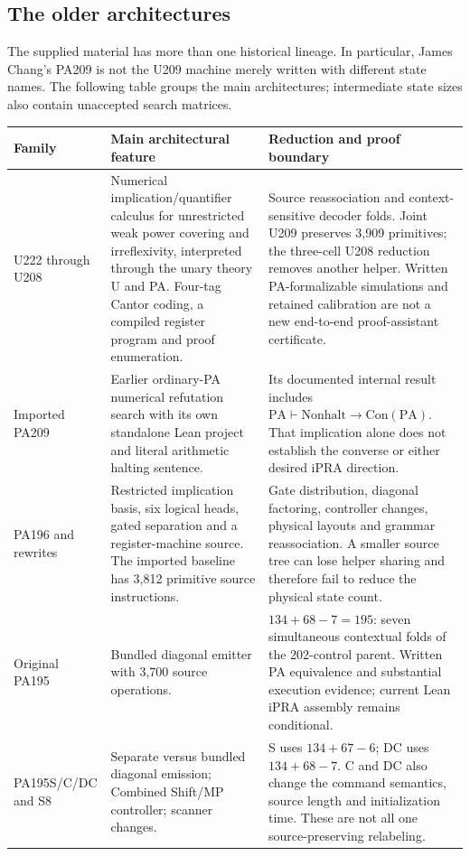 \subsection{The older architectures}

The supplied material has more than one historical lineage. In particular,
James Chang's PA209 is not the U209 machine merely written with different
state names. The following table groups the main architectures; intermediate
state sizes also contain unaccepted search matrices.

\begin{longtable}{@{}p{}p{}p{}@{}}
\toprule
Family & Main architectural feature & Reduction and proof boundary\\
\midrule\endhead
U222 through U208 &
Numerical implication/quantifier calculus for unrestricted weak power covering
and irreflexivity, interpreted through the unary theory U and PA. Four-tag
Cantor coding, a compiled register program and proof enumeration. &
Source reassociation and context-sensitive decoder folds. Joint U209 preserves
3,909 primitives; the three-cell U208 reduction removes another helper.
Written PA-formalizable simulations and retained calibration are not a new
end-to-end proof-assistant certificate.\\[5pt]
Imported PA209 &
Earlier ordinary-PA numerical refutation search with its own standalone Lean
project and literal arithmetic halting sentence. &
Its documented internal result includes
$\mathrm{PA}\vdash\mathrm{Nonhalt}\to\mathrm{Con(PA)}$.
That implication alone does not establish the converse or either desired
iPRA direction.\\[5pt]
PA196 and rewrites &
Restricted implication basis, six logical heads, gated separation and a
register-machine source. The imported baseline has 3,812 primitive source
instructions. &
Gate distribution, diagonal factoring, controller changes, physical layouts
and grammar reassociation. A smaller source tree can lose helper sharing and
therefore fail to reduce the physical state count.\\[5pt]
Original PA195 &
Bundled diagonal emitter with 3,700 source operations. &
$134+68-7=195$: seven simultaneous contextual folds of the 202-control parent.
Written PA equivalence and substantial execution evidence; current Lean iPRA
assembly remains conditional.\\[5pt]
PA195S/C/DC and S8 &
Separate versus bundled diagonal emission; Combined Shift/MP controller;
scanner changes. &
S uses $134+67-6$; DC uses $134+68-7$. C and DC also change the command
semantics, source length and initialization time. These are not all one
source-preserving relabeling.\\
\bottomrule
\end{longtable}

